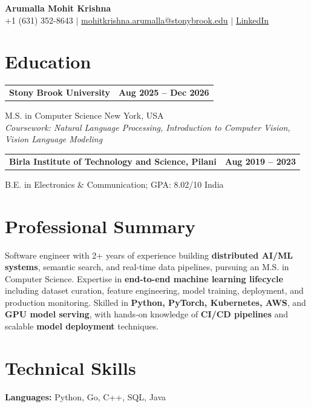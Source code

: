 \documentclass[letterpaper,10pt]{article}
\makeatletter
\newcommand{\entry}[2]{%
  \noindent
  \begin{tabularx}{\linewidth}
    {@{}>{\raggedright\arraybackslash}X@{\hspace{6pt}}r@{}}
    \textbf{#1} & #2
  \end{tabularx}\par
}
\makeatother
\begin{document}
\begin{center}
    {\LARGE\bfseries Arumalla Mohit Krishna}\\[3pt]
    +1 (631) 352-8643 $|$
    \href{mailto:mohitkrishna.arumalla@stonybrook.edu}
    {mohitkrishna.arumalla@stonybrook.edu} $|$
    \href{https://linkedin.com/in/mohit-krishna-arumalla}
    {LinkedIn}
\end{center}
\vspace{-8pt}

\section{Education}

\entry
  {\textbf{Stony Brook University}}
  {\textbf{Aug 2025 -- Dec 2026}}

M.S. in Computer Science \hfill New York, USA\\
\textit{
Coursework: Natural Language Processing,
Introduction to Computer Vision, Vision Language Modeling
}
\vspace{3pt}

\entry
  {\textbf{Birla Institute of Technology and Science, Pilani}}
  {\textbf{Aug 2019 -- 2023}}

B.E. in Electronics \& Communication; GPA: 8.02/10 \hfill India
\section{Professional Summary}

Software engineer with 2+ years of experience building \textbf{distributed AI/ML systems}, semantic search, and real-time data pipelines, pursuing an M.S. in Computer Science. Expertise in \textbf{end-to-end machine learning lifecycle} including dataset curation, feature engineering, model training, deployment, and production monitoring. Skilled in \textbf{Python, PyTorch, Kubernetes, AWS}, and \textbf{GPU model serving}, with hands-on knowledge of \textbf{CI/CD pipelines} and scalable \textbf{model deployment} techniques.

\section{Technical Skills}

\textbf{Languages:}
Python, Go, C++, SQL, Java\\
\end{document}
